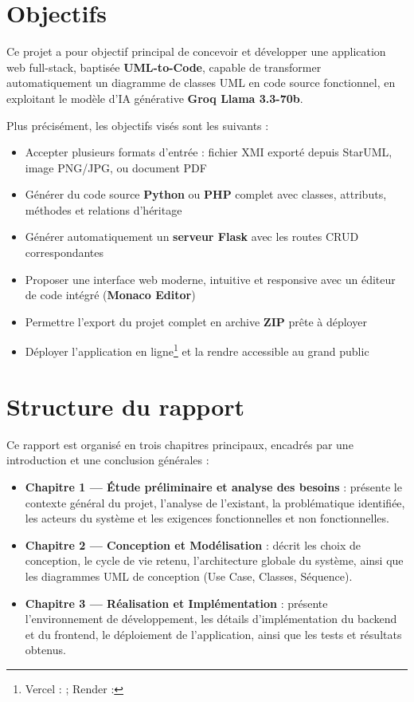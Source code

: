 \section*{Objectifs}

Ce projet a pour objectif principal de concevoir et développer une application web full-stack, baptisée \textbf{UML-to-Code}, capable de transformer automatiquement un diagramme de classes UML en code source fonctionnel, en exploitant le modèle d'IA générative \textbf{Groq Llama 3.3-70b}\fnGroq.

Plus précisément, les objectifs visés sont les suivants :

\begin{itemize}
    \item Accepter plusieurs formats d'entrée : fichier XMI exporté depuis StarUML, image PNG/JPG, ou document PDF
    \item Générer du code source \textbf{Python} ou \textbf{PHP} complet avec classes, attributs, méthodes et relations d'héritage
    \item Générer automatiquement un \textbf{serveur Flask} avec les routes CRUD correspondantes
    \item Proposer une interface web moderne, intuitive et responsive avec un éditeur de code intégré (\textbf{Monaco Editor})
    \item Permettre l'export du projet complet en archive \textbf{ZIP} prête à déployer
    \item Déployer l'application en ligne\footnote{Vercel :  ; Render : } et la rendre accessible au grand public
\end{itemize}

\section*{Structure du rapport}

Ce rapport est organisé en trois chapitres principaux, encadrés par une introduction et une conclusion générales :

\begin{itemize}
    \item \textbf{Chapitre 1 — Étude préliminaire et analyse des besoins} : présente le contexte général du projet, l'analyse de l'existant, la problématique identifiée, les acteurs du système et les exigences fonctionnelles et non fonctionnelles.

    \item \textbf{Chapitre 2 — Conception et Modélisation} : décrit les choix de conception, le cycle de vie retenu, l'architecture globale du système, ainsi que les diagrammes UML de conception (Use Case, Classes, Séquence).

    \item \textbf{Chapitre 3 — Réalisation et Implémentation} : présente l'environnement de développement, les détails d'implémentation du backend et du frontend, le déploiement de l'application, ainsi que les tests et résultats obtenus.
\end{itemize}